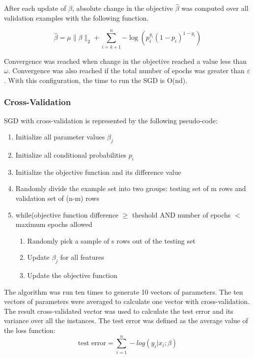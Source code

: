 After each update of $\beta$, absolute change in the objective $\widehat{\beta}$ was computed over all validation examples with the following function.

\begin{equation}
    \widehat{\beta} = \mu \|\beta\|_2 + \sum_{i=k+1}^{n}{-\log(p_i^{y_i}(1 - p_i)^{1-y_i})}
\end{equation}

Convergence was reached when change in the objective reached a value less than $\omega$. Convergence was also reached if the total number of epochs was greater than $\varepsilon$. With this configuration, the time to run the SGD is O(nd).


\subsubsection{Cross-Validation}
SGD with cross-validation is represented by the following pseudo-code:
\begin{enumerate}
    \item Initialize all parameter values $\beta_j$
    \item Initialize all conditional probabilities $p_i$
    \item Initialize the objective function and its difference value
    \item Randomly divide the example set into two groups: testing set of m rows and validation set of (n-m) rows
    \item while(objective function difference $\geq$ theshold AND number of epochs $<$ maximum epochs allowed
    \begin{enumerate}
        \item Randomly pick a sample of s rows out of the testing set
        \item Update $\beta_j$ for all features
        \item Update the objective function
    \end{enumerate}
\end{enumerate}



The algorithm was run ten times to generate 10 vectors of parameters. The ten vectors of parameters were averaged to calculate one vector with cross-validation. The result cross-validated vector was used to calculate the test error and its variance over all the instances. The test error was defined as the average value of the loss function:
\begin{equation}
        \textrm{test error} = \sum_{i=1}^{n} -log(y_i | x_i ; \beta )
\end{equation}


